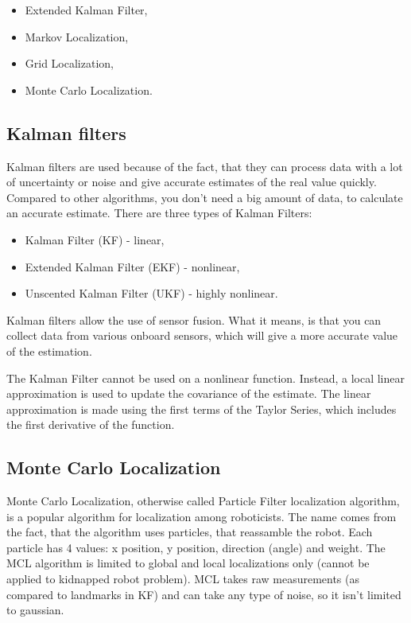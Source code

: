 \documentclass[10pt,journal,compsoc]{IEEEtran}
\begin{document}
    \begin{itemize}
        \item Extended Kalman Filter,
        \item Markov Localization,
        \item Grid Localization,
        \item Monte Carlo Localization.
    \end{itemize}

    \subsection{Kalman filters}

    Kalman filters are used because of the fact, that they can process data with a lot of uncertainty or noise and give accurate estimates of the real value quickly. Compared to other algorithms, you don't need a big amount of data, to calculate an accurate estimate. There are three types of Kalman Filters:

    \begin{itemize}
        \item Kalman Filter (KF) - linear,
        \item Extended Kalman Filter (EKF) - nonlinear,
        \item Unscented Kalman Filter (UKF) - highly nonlinear.
    \end{itemize}

    Kalman filters allow the use of sensor fusion. What it means, is that you can collect data from various onboard sensors, which will give a more accurate value of the estimation. 

    The Kalman Filter cannot be used on a nonlinear function. Instead, a local linear approximation is used to update the covariance of the estimate. The linear approximation is made using the first terms of the Taylor Series, which includes the first derivative of the function.

    \subsection{Monte Carlo Localization}

    Monte Carlo Localization, otherwise called Particle Filter localization algorithm, is a popular algorithm for localization among roboticists. The name comes from the fact, that the algorithm uses particles, that reassamble the robot. Each particle has 4 values: x position, y position, direction (angle) and weight. The MCL algorithm is limited to global and local localizations only (cannot be applied to kidnapped robot problem). MCL takes raw measurements (as compared to landmarks in KF) and can take any type of noise, so it isn't limited to gaussian. 
\end{document}
